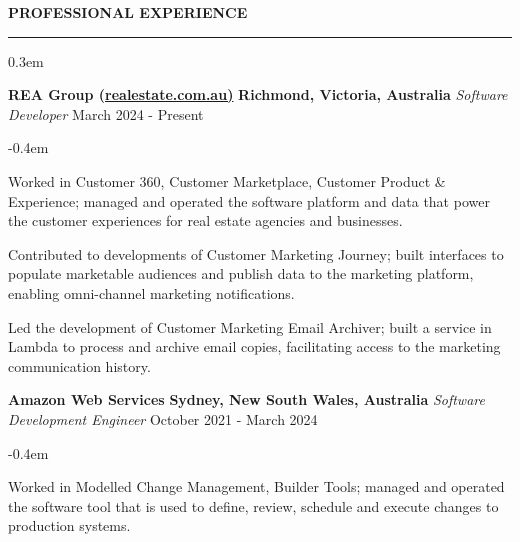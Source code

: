 \documentclass{cv}
\begin{document}
\smallskip


\textbf{\uppercase{Professional Experience}}
\sectionlineskip
\hrule height 0.1em
\begin{list}{}{\setlength{\leftmargin}{0em}}
\itemsep 0.3em
\item
    \textbf{REA Group (\href{https://realestate.com.au/}{realestate.com.au)}} \hfill \textbf{Richmond, Victoria, Australia}%
    \vspace{0.1em} \newline 
    {\textit{Software Developer}} \hfill {March 2024 - Present}%
    \begin{list}{\raisebox{0.2em}{\tiny$\bullet$} \hspace{0em}}{\setlength{\leftmargin}{2.0em}}
        \itemsep -0.4em \vspace{-0.4em}
        \item Worked in Customer 360, Customer Marketplace, Customer Product \& Experience; managed and operated the software platform and data that power the customer experiences for real estate agencies and businesses.
        \item Contributed to developments of Customer Marketing Journey; built interfaces to populate marketable audiences and publish data to the marketing platform, enabling omni-channel marketing notifications.
        \item Led the development of Customer Marketing Email Archiver; built a service in Lambda to process and archive email copies, facilitating access to the marketing communication history.
    \end{list}
\item 
    \textbf{Amazon Web Services} \hfill \textbf{Sydney, New South Wales, Australia}%
    \vspace{0.1em} \newline 
    {\textit{Software Development Engineer}} \hfill {October 2021 - March 2024}%
    \begin{list}{\raisebox{0.2em}{\tiny$\bullet$} \hspace{0em}}{\setlength{\leftmargin}{2.0em}}
        \itemsep -0.4em \vspace{-0.4em}
        \item Worked in Modelled Change Management, Builder Tools; managed and operated the software tool that is used to define, review, schedule and execute changes to production systems.

\end{list}
\end{list}
\end{document}
